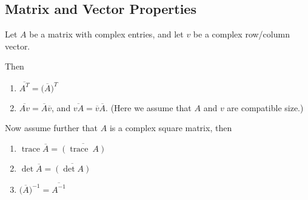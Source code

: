 \documentclass{article}
\newcommand{\ccj}[1]{\overline{#1}}
\newcommand{\trace}[0]{\operatorname{trace}}
\begin{document}
\subsection{Matrix and Vector Properties}

Let $A$ be a matrix with complex entries, and let $v$ be a complex row/column vector. 

Then
\begin{enumerate}
 \item $\ccj{A^T}=\big(\ccj{A}\big)^T$
 \item $\ccj{Av}=\ccj{A}\ccj{v}$, and $\ccj{vA}=\ccj{v}\ccj{A}$. (Here we assume that $A$ and $v$ are
compatible size.)
\end{enumerate}

Now assume further that $A$ is a complex square matrix, then

\begin{enumerate}
 \item $\trace \ccj{A} = \ccj{(\trace\ A)}$
 \item $\det \ccj{A} = \ccj{(\det A)}$
 \item $\big(\ccj{A}\big)^{-1} = \ccj{A^{-1}}$
\end{enumerate}
\end{document}
